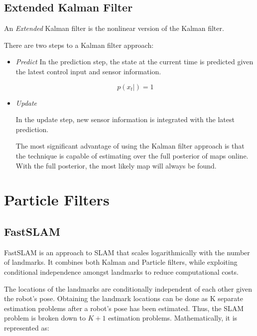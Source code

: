 \documentclass[10pt,conference]{ieeeconf}
\begin{document}
    
    \subsection{Extended Kalman Filter}
    
    An \emph{Extended} Kalman filter is the nonlinear version of the Kalman filter.
    
    There are two steps to a Kalman filter approach:
    
    \begin{itemize}
    	\item \emph{Predict}
    	In the prediction step, the state at the current time is predicted given the latest control input and sensor information. 
    	
		\begin{equation}
		p(x_t | )= 1
		\end{equation}		    	

    	\item \emph{Update}
    	
    	In the update step, new sensor information is integrated with the latest prediction. 
    	
    	The most significant advantage of using the Kalman filter approach is that the technique is capable of estimating over the full posterior of maps online. With the full posterior, the most likely map will always be found. 
    	
    	
    \end{itemize}
    
	


\section {Particle Filters}

	

	
	\subsection{FastSLAM}
	
	
	FastSLAM \cite{montemerlo2002fastslam} is an approach to SLAM that scales logarithmically with the number of landmarks. It combines both Kalman and Particle filters, while exploiting conditional independence amongst landmarks to reduce computational costs.
	
	The locations of the landmarks are conditionally independent of each other given the robot's pose. Obtaining the landmark locations can be done as K separate estimation problems after a robot's pose has been estimated. Thus, the SLAM problem is broken down to $K+1$ estimation problems. Mathematically, it is represented as:
	
\end{document}
